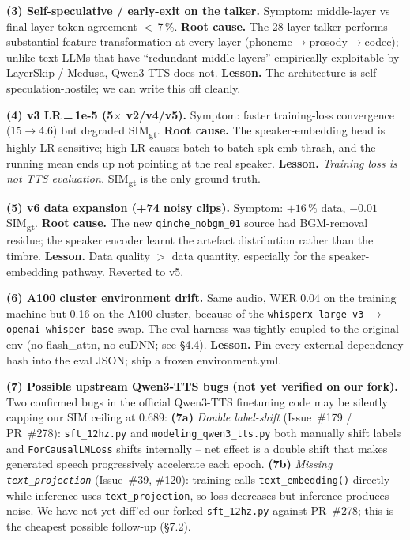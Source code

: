 \documentclass[10pt,a4paper]{article}
\begin{document}
\noindent\textbf{(3) Self-speculative / early-exit on the talker.}
Symptom: middle-layer vs final-layer token agreement $<$\,7\,\%.
\textbf{Root cause.} The 28-layer talker performs substantial feature
transformation at every layer (phoneme$\to$prosody$\to$codec); unlike text
LLMs that have ``redundant middle layers'' empirically exploitable by
LayerSkip / Medusa, Qwen3-TTS does not. \textbf{Lesson.} The architecture
is self-speculation-hostile; we can write this off cleanly.

\noindent\textbf{(4) v3 LR\,=\,1e-5 (5$\times$ v2/v4/v5).} Symptom: faster
training-loss convergence (15$\to$4.6) but degraded SIM\textsubscript{gt}.
\textbf{Root cause.} The speaker-embedding head is highly LR-sensitive;
high LR causes batch-to-batch spk-emb thrash, and the running mean ends up
not pointing at the real speaker. \textbf{Lesson.} \emph{Training loss is
not TTS evaluation.} SIM\textsubscript{gt} is the only ground truth.

\noindent\textbf{(5) v6 data expansion (+74 noisy clips).} Symptom: $+16\,\%$
data, $-0.01$ SIM\textsubscript{gt}. \textbf{Root cause.} The new
\texttt{qinche\_nobgm\_01} source had BGM-removal residue; the speaker
encoder learnt the artefact distribution rather than the timbre.
\textbf{Lesson.} Data quality $>$ data quantity, especially for the
speaker-embedding pathway. Reverted to v5.

\noindent\textbf{(6) A100 cluster environment drift.} Same audio,
WER 0.04 on the training machine but 0.16 on the A100 cluster, because
of the \texttt{whisperx large-v3} $\to$ \texttt{openai-whisper base}
swap. The eval harness was tightly coupled to the original env (no
flash\_attn, no cuDNN; see \S4.4). \textbf{Lesson.} Pin every external
dependency hash into the eval JSON; ship a frozen environment.yml.

\noindent\textbf{(7) Possible upstream Qwen3-TTS bugs (not yet verified
on our fork).} Two confirmed bugs in the official Qwen3-TTS finetuning
code may be silently capping our SIM ceiling at 0.689:
\textbf{(7a)} \emph{Double label-shift} (Issue~\#179 / PR~\#278):
\texttt{sft\_12hz.py} and \texttt{modeling\_qwen3\_tts.py} both manually
shift labels and \texttt{ForCausalLMLoss} shifts internally -- net effect
is a double shift that makes generated speech progressively accelerate
each epoch.
\textbf{(7b)} \emph{Missing \texttt{text\_projection}} (Issue~\#39, \#120):
training calls \texttt{text\_embedding()} directly while inference uses
\texttt{text\_projection}, so loss decreases but inference produces noise.
We have not yet diff'ed our forked \texttt{sft\_12hz.py} against PR~\#278;
this is the cheapest possible follow-up (\S7.2).
\end{document}
